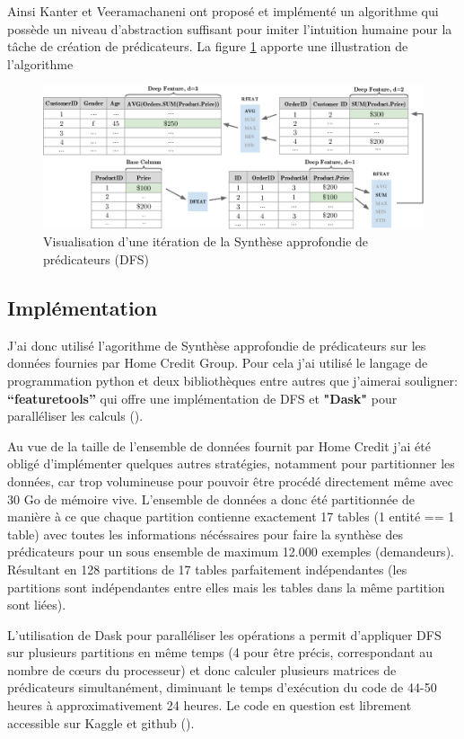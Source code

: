 Ainsi Kanter et Veeramachaneni ont proposé et implémenté un algorithme qui possède un niveau d'abstraction suffisant pour imiter l'intuition humaine pour la tâche de création de prédicateurs. La figure \ref{fig:fig2} apporte une illustration de l’algorithme

\begin{figure}
    \centering
    \includegraphics[width=0.75\linewidth]{images/Fig4DFS.png}
    \caption{Visualisation d'une itération de la Synthèse approfondie de prédicateurs (DFS)}
    \label{fig:fig2}
\end{figure}

\subsection{Implémentation}
\label{chap3.sec1.sub2}
J'ai donc utilisé l'agorithme de Synthèse approfondie de prédicateurs sur les données fournies par Home Credit Group. Pour cela j’ai utilisé le langage de programmation python et deux bibliothèques entre autres que j'aimerai souligner: \textbf{“featuretools”} qui
offre une implémentation de DFS et \textbf{"Dask"} pour paralléliser les calculs (\cite{dask2016dask}).

Au vue de la taille de l’ensemble de données fournit par Home Credit j’ai été obligé d’implémenter quelques autres stratégies, notamment pour partitionner les données, car trop volumineuse pour pouvoir être procédé directement même avec 30 Go de mémoire vive. L'ensemble de données a donc été partitionnée de manière à ce que chaque partition contienne exactement 17 tables (1 entité == 1 table) avec toutes les informations nécéssaires pour faire la synthèse des prédicateurs pour un sous ensemble de maximum 12.000 exemples (demandeurs). Résultant en 128 partitions de 17 tables parfaitement indépendantes (les partitions sont indépendantes entre elles mais les tables dans la même partition sont liées).

L'utilisation de Dask pour paralléliser les opérations a permit d'appliquer DFS sur plusieurs partitions en même temps (4 pour être précis, correspondant au nombre de cœurs du processeur) et donc calculer plusieurs matrices de prédicateurs simultanément, diminuant le temps d'exécution du code de 44-50 heures à approximativement 24 heures. Le code en question est librement accessible sur Kaggle et github (\cite{diarra2024autofeatureengineering}).
